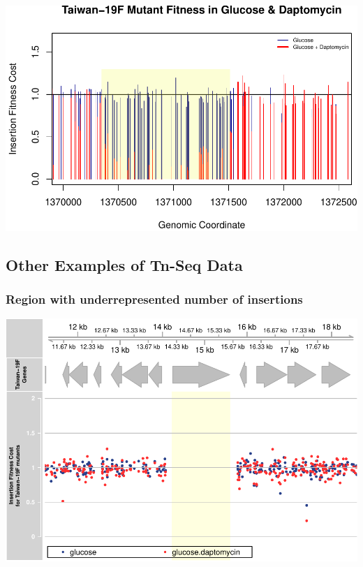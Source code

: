 \documentclass[11pt,]{article}
\begin{document}
\includegraphics{magentaManual_files/figure-latex/unnamed-chunk-9-1.pdf}

\subsection{Other Examples of Tn-Seq
Data}\label{other-examples-of-tn-seq-data}

\subsubsection{Region with underrepresented number of
insertions}\label{region-with-underrepresented-number-of-insertions}

\includegraphics{magentaManual_files/figure-latex/unnamed-chunk-10-1.pdf}
\end{document}

